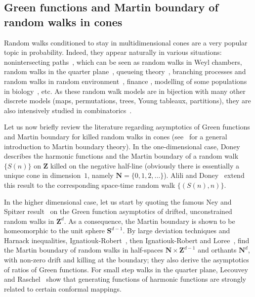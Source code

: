\documentclass[10pt]{amsart}
\theoremstyle{definition}\newtheorem{defi}[theo]{Definition}\newtheorem{rema}[theo]{Remark}\newtheorem{exam}[theo]{Example}\newtheorem{exem}[theo]{Example}\newtheorem{nota}[theo]{Notation}
\newcommand{\bfS}{\mathbf{S}}
\newcommand{\bfZ}{\mathbf{Z}}
\newcommand{\bfN}{\mathbf{N}}
\begin{document}
\subsection*{Green functions and Martin boundary of random walks in cones}
Random walks conditioned to stay in multidimensional cones are a very popular topic in probability. Indeed, they appear naturally in various situations: nonintersecting paths~\cite{DeWa-10,EiKo-08,St-90}, which can be seen as random walks in Weyl chambers, random walks in the quarter plane~\cite{FaIaMa-17,Ra-11}, queueing theory~\cite{CoBo-83}, branching processes and random walks in random environment~\cite{AfGeKeVa-05}, finance \cite{CodL-13}, modelling of some populations in biology~\cite{BiTr-12}, etc. As these random walk models are in bijection with many other discrete models (maps, permutations, trees, Young tableaux, partitions), they are also intensively studied in combinatorics~\cite{BoBMKaMe-16,BMMi-10,DrHaRoSi-18}.



Let us now briefly review the literature regarding asymptotics of Green functions and Martin boundary for killed random walks in cones (see~\cite{Sa-97} for a general introduction to Martin boundary theory). In the one-dimensional case, Doney~\cite{Do-98} describes the harmonic functions and the Martin boundary of a random walk $\{S(n)\}$ on $\bfZ$ killed on the negative half-line (obviously there is essentially a unique cone in dimension~$1$, namely $\bfN=\{0,1,2,\ldots \}$). Alili and Doney~\cite{AlDo-01} extend this result to the corresponding space-time random walk $\{(S(n),n)\}$.

In the higher dimensional case, let us start by quoting the famous Ney and Spitzer result~\cite{NeSp-66} on the Green function asymptotics of drifted, unconstrained random walks in $\bfZ^d$. As a consequence, the Martin boundary is shown to be homeomorphic to the unit sphere $\bfS^{d-1}$. By large deviation techniques and Harnack inequalities, Ignatiouk-Robert~\cite{IR-08,IR-09}, then Ignatiouk-Robert and Loree~\cite{IRLo-10}, find the Martin boundary of random walks in half-spaces $\bfN\times \bfZ^{d-1}$ and orthants $\bfN^d$, with non-zero drift and killing at the boundary; they also derive the asymptotics of ratios of Green functions. For small step walks in the quarter plane, Lecouvey and Raschel~\cite{LeRa-16} show that generating functions of harmonic functions are strongly related to certain conformal mappings.
\end{document}
